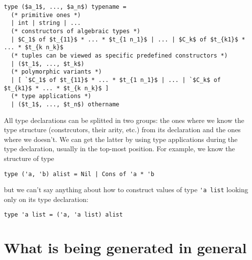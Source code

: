 \documentclass[acmsmall,review,anonymous]{acmart}\settopmatter{printfolios=true,printccs=false,printacmref=false}
\let\listinline\lstinline
\begin{document}
\begin{lstlisting}
type ($a_1$, ..., $a_n$) typename =
  (* primitive ones *)
  | int | string | ...
  (* constructors of algebraic types *)
  | $C_1$ of $t_{11}$ * ... * $t_{1 n_1}$ | ... | $C_k$ of $t_{k1}$ * ... * $t_{k n_k}$
  (* tuples can be viewed as specific predefined constructors *)
  | ($t_1$, ..., $t_k$)
  (* polymorphic variants *)
  | [ `$C_1$ of $t_{11}$ * ... * $t_{1 n_1}$ | ... | `$C_k$ of $t_{k1}$ * ... * $t_{k n_k}$ ]
  (* type applications *)
  | ($t_1$, ..., $t_n$) othername
\end{lstlisting}
All type declarations can be splitted in two groups: the ones where we know the type structure (constrcutors, their arity, etc.) from its declaration and the ones where we doesn't. We can get the latter by using type applications during the type declaration, usually in the top-most position. For example, we know the structure of type 
\begin{lstlisting}
type ('a, 'b) alist = Nil | Cons of 'a * 'b
\end{lstlisting}
but we can't say anything about how to construct values of type \listinline{'a list} looking only on its type declaration:
\begin{lstlisting}
type 'a list = ('a, 'a list) alist
\end{lstlisting}


\section{What is being generated in general}
\end{document}
